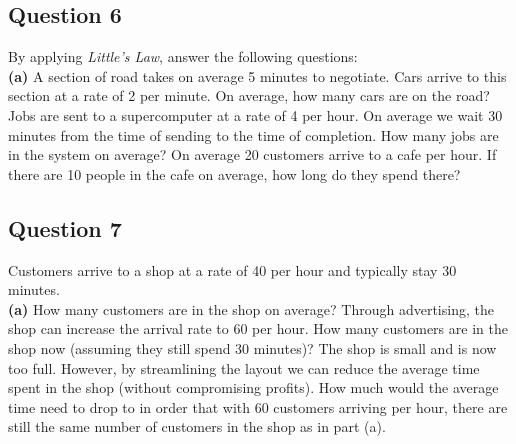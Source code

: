 \documentclass[12pt]{article}
\begin{document}
\subsection*{Question 6}
By applying \emph{Little's Law}, answer the following questions:\\[-0.2cm]

{\bf(a)} A section of road takes on average 5 minutes to negotiate. Cars arrive to this section at a rate of 2 per minute. On average, how many cars are on the road?   Jobs are sent to a supercomputer at a rate of 4 per hour. On average we wait 30 minutes from the time of sending to the time of completion. How many jobs are in the system on average?  On average 20 customers arrive to a cafe per hour. If there are 10 people in the cafe on average, how long do they spend there?



\subsection*{Question 7}
Customers arrive to a shop at a rate of 40 per hour and typically stay 30 minutes. \\[-0.2cm]

{\bf(a)} How many customers are in the shop on average?  Through advertising, the shop can increase the arrival rate to 60 per hour. How many customers are in the shop now (assuming they still spend 30 minutes)?  The shop is small and is now too full. However, by streamlining the layout we can reduce the average time spent in the shop (without compromising profits). How much would the average time need to drop to in order that with 60 customers arriving per hour, there are still the same number of customers in the shop as in part (a).
\end{document}
